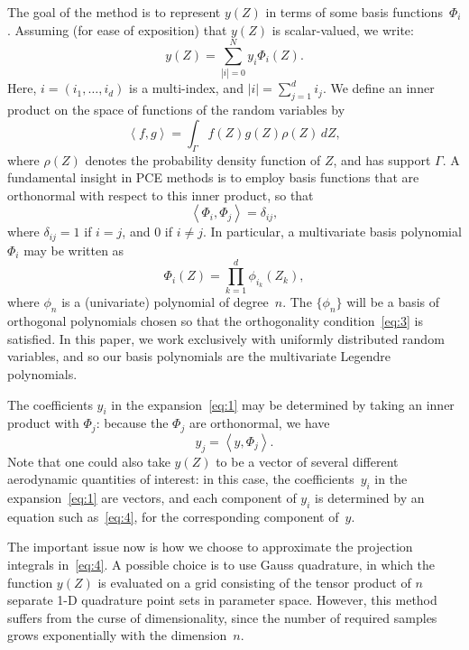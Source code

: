 \documentclass{aiaa-tc}%
\def\ip<#1,#2>{\left\langle #1,#2\right\rangle}
\begin{document}
The goal of the method is to represent $y(Z)$ in terms of some basis
functions~$\Phi_i$. Assuming (for ease of exposition) that $y(Z)$ is
scalar-valued, we write:
\begin{equation}
  \label{eq:1}
  y(Z) = \sum_{|i|=0}^N y_i \Phi_i(Z).
\end{equation}
Here, $i=(i_1,\ldots,i_d)$ is a multi-index, and $|i|=\sum_{j=1}^d i_j$.  We define an inner
product on the space of functions of the random variables by
\begin{equation}
  \label{eq:2}
  \ip<f,g> = \int_\Gamma f(Z) g(Z) \rho(Z)\,dZ,
\end{equation}
where $\rho(Z)$ denotes the probability density function of $Z$, and
has support $\Gamma$.  A fundamental insight in PCE methods is to
employ basis functions that are orthonormal with respect to this
inner product, so that
\begin{equation}
  \label{eq:3}
  \ip<\Phi_i,\Phi_j> = \delta_{ij},
\end{equation}
where $\delta_{ij}=1$ if $i=j$, and $0$ if $i\ne j$. In particular,
a multivariate basis polynomial $\Phi_i$ may be written as
\begin{equation}
\Phi_i(Z) = \prod_{k=1}^d \phi_{i_k}(Z_k),
\end{equation}
where $\phi_n$ is a (univariate) polynomial of degree~$n$. The $\{ \phi_n\}$ will be a basis of
orthogonal polynomials chosen so that the orthogonality
condition~\eqref{eq:3} is satisfied. In this paper, we work
exclusively with uniformly distributed random variables, and so our
basis polynomials are the multivariate Legendre polynomials.

The coefficients $y_i$ in the expansion~\eqref{eq:1} may be determined
by taking an inner product with $\Phi_j$: because the $\Phi_j$ are
orthonormal, we have
\begin{equation}
  \label{eq:4}
  y_j = \ip<y,\Phi_j>.
\end{equation}
Note that one could also take $y(Z)$ to be a vector of several different
aerodynamic quantities of interest: in this case, the coefficients~$y_i$ in the
expansion~\eqref{eq:1} are vectors, and each component of $y_i$ is determined by
an equation such as~\eqref{eq:4}, for the corresponding component of~$y$.

The important issue now is how we choose to approximate the projection
integrals in~\eqref{eq:4}. A possible choice is to use Gauss
quadrature, in which the function $y(Z)$ is evaluated on a grid
consisting of the tensor product of $n$ separate 1-D quadrature point
sets in parameter space. However, this method suffers from the
curse of dimensionality, since the number of required samples grows
exponentially with the dimension~$n$.
\end{document}
